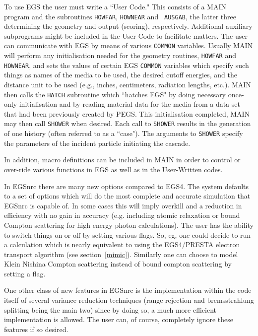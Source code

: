 To use EGS the user must write a ``User Code."  This consists of a
MAIN program and the subroutines {\tt HOWFAR}, {\tt HOWNEAR} and {\tt
AUSGAB}, the latter three determining the geometry and output (scoring),
respectively.  Additional auxiliary subprograms might be included in the
User Code to facilitate matters.  The user can communicate with EGS by
means of various {\tt COMMON} variables.  Usually MAIN will perform
any initialisation needed for the geometry routines, {\tt HOWFAR}
and {\tt HOWNEAR}, and sets the values of certain EGS {\tt COMMON}
variables which specify such things as names of the media to be used,
the desired cutoff energies, and the distance unit to be used (e.g.,
inches, centimeters, radiation lengths, etc.).  MAIN then calls the
{\tt HATCH} subroutine which ``hatches EGS" by doing necessary once-only
initialisation and by reading material data for the media from a data set
that had been previously created by PEGS.  This initialisation completed,
MAIN may then call {\tt SHOWER} when desired.  Each call to {\tt SHOWER}
results in the generation of one history (often referred to as a ``case").
The arguments to {\tt SHOWER} specify the parameters of the incident
particle initiating the cascade.

In addition, macro definitions can be included in MAIN in order to control
or over-ride various functions in EGS as well as in the User-Written
codes.

In EGSnrc there are many new options compared to EGS4.  The system
defaults to a set of options which will do the most complete and accurate
simulation that EGSnrc is capable of. In some cases this will imply
overkill and a reduction in efficiency with no gain in accuracy (e.g.
including atomic relaxation or bound Compton scattering for high energy
photon calculations). The user has the ability to switch things on or off
by setting various  flags.  So, eg, one could decide to run a calculation
which is nearly equivalent to using the EGS4/PRESTA electron transport
algorithm (see section~\ref{mimic}). Similarly one can choose to model
Klein Nishina Compton scattering instead of bound compton scattering by
setting a flag.

One other class of new features in EGSnrc is the implementation within the
code itself of several variance reduction techniques (range rejection and
bremsstrahlung splitting being the main two) since by doing so, a much more
efficient implementation is allowed. The user can, of course, completely
ignore these features if so desired.


